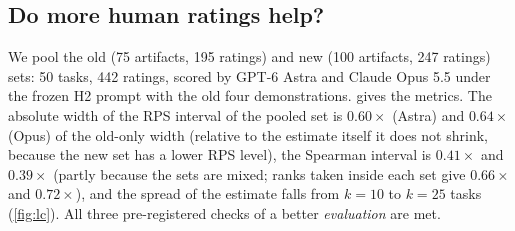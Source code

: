 \subsection{Do more human ratings help?}
\label{sec:exp25}
We pool the old (75 artifacts, 195 ratings) and new (100 artifacts, 247 ratings) sets: 50 tasks, 442 ratings, scored by GPT-6 Astra and Claude Opus 5.5 under the frozen H2 prompt with the old four demonstrations.
 gives the metrics.
The absolute width of the RPS interval of the pooled set is $0.60\times$ (Astra) and $0.64\times$ (Opus) of the old-only width (relative to the estimate itself it does not shrink, because the new set has a lower RPS level), the Spearman interval is $0.41\times$ and $0.39\times$ (partly because the sets are mixed; ranks taken inside each set give $0.66\times$ and $0.72\times$), and the spread of the estimate falls from $k=10$ to $k=25$ tasks (\cref{fig:lc}).
All three pre-registered checks of a better \emph{evaluation} are met.

\begin{table}[t]
\caption{Old, new and pooled sets (task-cluster bootstrap 95\% intervals, $10{,}000$ draws). Constant = pooled human distribution (leave-one-task-out); on the pooled row it is computed over both sets together. RPS, CE and TVD first.}
\label{tab:exp25}
\centering\footnotesize\setlength{\tabcolsep}{3pt}
\end{table}

